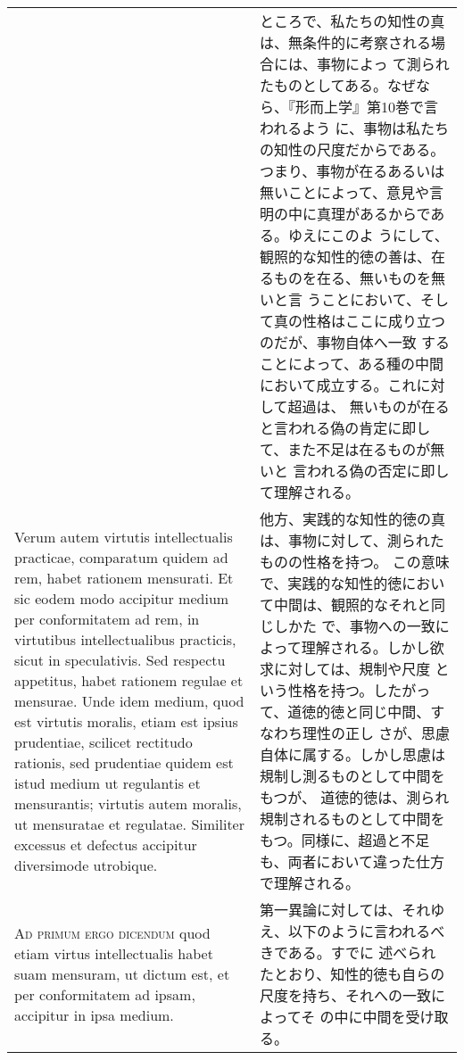 \documentclass[10pt]{jsarticle}
\begin{document}
\begin{longtable}{p{21em}p{21em}}
&

 ところで、私たちの知性の真は、無条件的に考察される場合には、事物によっ
 て測られたものとしてある。なぜなら、『形而上学』第10巻で言われるよう
 に、事物は私たちの知性の尺度だからである。つまり、事物が在るあるいは
 無いことによって、意見や言明の中に真理があるからである。ゆえにこのよ
 うにして、観照的な知性的徳の善は、在るものを在る、無いものを無いと言
 うことにおいて、そして真の性格はここに成り立つのだが、事物自体へ一致
 することによって、ある種の中間において成立する。これに対して超過は、
 無いものが在ると言われる偽の肯定に即して、また不足は在るものが無いと
 言われる偽の否定に即して理解される。

\\



 Verum autem virtutis intellectualis practicae, comparatum quidem ad
 rem, habet rationem mensurati. Et sic eodem modo accipitur medium per
 conformitatem ad rem, in virtutibus intellectualibus practicis, sicut
 in speculativis. Sed respectu appetitus, habet rationem regulae et
 mensurae. Unde idem medium, quod est virtutis moralis, etiam est
 ipsius prudentiae, scilicet rectitudo rationis, sed prudentiae quidem
 est istud medium ut regulantis et mensurantis; virtutis autem
 moralis, ut mensuratae et regulatae. Similiter excessus et defectus
 accipitur diversimode utrobique.


&

 他方、実践的な知性的徳の真は、事物に対して、測られたものの性格を持つ。
 この意味で、実践的な知性的徳において中間は、観照的なそれと同じしかた
 で、事物への一致によって理解される。しかし欲求に対しては、規制や尺度
 という性格を持つ。したがって、道徳的徳と同じ中間、すなわち理性の正し
 さが、思慮自体に属する。しかし思慮は規制し測るものとして中間をもつが、
 道徳的徳は、測られ規制されるものとして中間をもつ。同様に、超過と不足
 も、両者において違った仕方で理解される。

\\




{\scshape Ad primum ergo dicendum} quod etiam virtus intellectualis
habet suam mensuram, ut dictum est, et per conformitatem ad ipsam,
accipitur in ipsa medium.

&

 第一異論に対しては、それゆえ、以下のように言われるべきである。すでに
 述べられたとおり、知性的徳も自らの尺度を持ち、それへの一致によってそ
 の中に中間を受け取る。

\\


\end{longtable}
\end{document}
